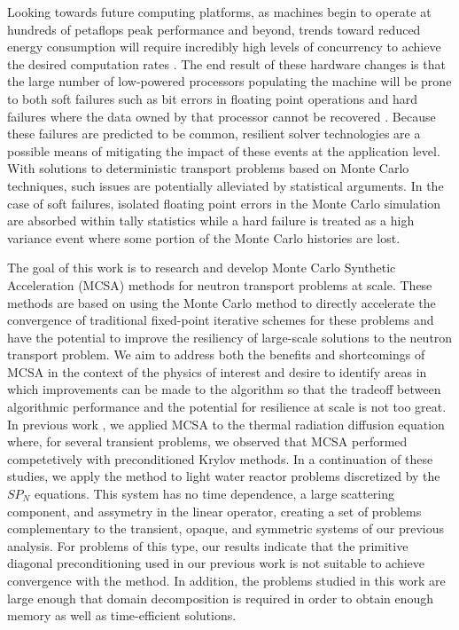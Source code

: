 \documentclass[letterpaper,11pt]{article}
\begin{document}
Looking towards future computing platforms, as machines begin to
operate at hundreds of petaflops peak performance and beyond, trends
toward reduced energy consumption will require incredibly high levels
of concurrency to achieve the desired computation rates
\cite{kogge_using_2011}. The end result of these hardware changes is
that the large number of low-powered processors populating the machine
will be prone to both soft failures such as bit errors in floating
point operations and hard failures where the data owned by that
processor cannot be recovered
\cite{u.s._department_of_energy_resilient_2012}. Because these
failures are predicted to be common, resilient solver technologies are
a possible means of mitigating the impact of these events at the
application level. With solutions to deterministic transport problems
based on Monte Carlo techniques, such issues are potentially
alleviated by statistical arguments. In the case of soft failures,
isolated floating point errors in the Monte Carlo simulation are
absorbed within tally statistics while a hard failure is treated as a
high variance event where some portion of the Monte Carlo histories
are lost.

The goal of this work is to research and develop Monte Carlo Synthetic
Acceleration (MCSA) methods for neutron transport problems at
scale. These methods are based on using the Monte Carlo method to
directly accelerate the convergence of traditional fixed-point
iterative schemes for these problems and have the potential to improve
the resiliency of large-scale solutions to the neutron transport
problem. We aim to address both the benefits and shortcomings of MCSA
in the context of the physics of interest and desire to identify areas
in which improvements can be made to the algorithm so that the
tradeoff between algorithmic performance and the potential for
resilience at scale is not too great. In previous work
\cite{evans_monte_2014}, we applied MCSA to the thermal radiation
diffusion equation where, for several transient problems, we observed
that MCSA performed competetively with preconditioned Krylov
methods. In a continuation of these studies, we apply the method to
light water reactor problems discretized by the $SP_N$ equations. This
system has no time dependence, a large scattering component, and
assymetry in the linear operator, creating a set of problems
complementary to the transient, opaque, and symmetric systems of our
previous analysis. For problems of this type, our results indicate
that the primitive diagonal preconditioning used in our previous work
is not suitable to achieve convergence with the method. In addition,
the problems studied in this work are large enough that domain
decomposition is required in order to obtain enough memory as well as
time-efficient solutions.
\end{document}
